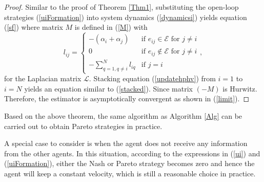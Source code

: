 \documentclass[letterpaper, 10 pt, conference,onecolumn]{ieeeconf}  %
\begin{document}
\begin{proof}
Similar to the proof of Theorem \ref{Thm1}, substituting the open-loop strategies (\ref{uiFormation}) into system dynamics (\ref{dynamicsi}) yields equation (\ref{sf}) where matrix $M$ is defined in (\ref{M}) with
\begin{equation}
l_{ij}=\left\{\begin{array}{ll}
-(\alpha_i+\alpha_j)&\mbox{if $e_{ij}\in\mathcal{E}$ for $j\neq i$}\\
0&\mbox{if $e_{ij}\notin\mathcal{E}$ for $j\neq i$}\\
\displaystyle -\sum^N_{q=1,q\neq i}l_{iq}&\mbox{if $j=i$}
\end{array}\right.,\label{laplacianFormation}
\end{equation}
for the Laplacian matrix $\mathcal{L}$. Stacking equation (\ref{updatehphv}) from $i=1$ to $i=N$ yields {an equation similar to} (\ref{stacked}). Since matrix $(-M)$ is Hurwitz. {Therefore, the estimator is asymptotically convergent as shown in (\ref{limit}).}
\end{proof}

Based on the above theorem, the same algorithm as Algorithm \ref{Alg} can be carried out to obtain Pareto strategies in practice.

{A special case to consider is when the agent does not receive any information from the other agents. In this situation, according to the expressions in (\ref{ui}) and (\ref{uiFormation}), either the Nash or Pareto strategy becomes zero and hence the agent will keep a constant velocity, which is still a reasonable choice in practice.}
\end{document}
